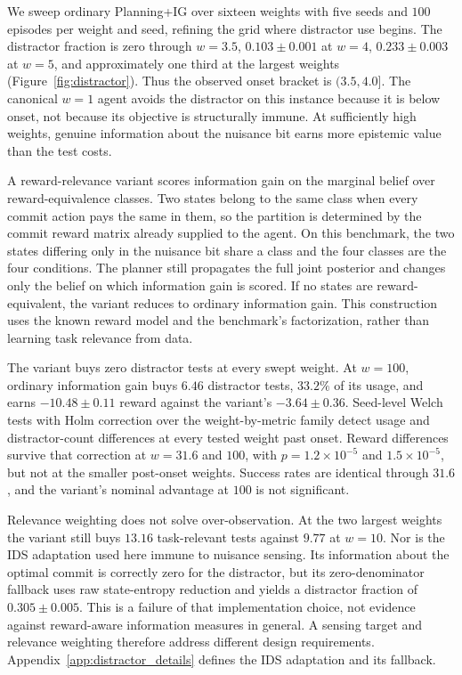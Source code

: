 \documentclass[runningheads]{llncs}
\begin{document}
We sweep ordinary Planning+IG over sixteen weights with five seeds and $100$ episodes per weight and seed, refining the grid where distractor use begins. The distractor fraction is zero through $w{=}3.5$, $0.103\pm0.001$ at $w{=}4$, $0.233\pm0.003$ at $w{=}5$, and approximately one third at the largest weights (Figure~\ref{fig:distractor}). Thus the observed onset bracket is $(3.5,4.0]$. The canonical $w{=}1$ agent avoids the distractor on this instance because it is below onset, not because its objective is structurally immune. At sufficiently high weights, genuine information about the nuisance bit earns more epistemic value than the test costs.

A reward-relevance variant scores information gain on the marginal belief over reward-equivalence classes. Two states belong to the same class when every commit action pays the same in them, so the partition is determined by the commit reward matrix already supplied to the agent. On this benchmark, the two states differing only in the nuisance bit share a class and the four classes are the four conditions. The planner still propagates the full joint posterior and changes only the belief on which information gain is scored. If no states are reward-equivalent, the variant reduces to ordinary information gain. This construction uses the known reward model and the benchmark's factorization, rather than learning task relevance from data.

The variant buys zero distractor tests at every swept weight. At $w{=}100$, ordinary information gain buys $6.46$ distractor tests, $33.2\%$ of its usage, and earns $-10.48\pm0.11$ reward against the variant's $-3.64\pm0.36$. Seed-level Welch tests with Holm correction over the weight-by-metric family detect usage and distractor-count differences at every tested weight past onset. Reward differences survive that correction at $w{=}31.6$ and $100$, with $p=1.2{\times}10^{-5}$ and $1.5{\times}10^{-5}$, but not at the smaller post-onset weights. Success rates are identical through $31.6$, and the variant's nominal advantage at $100$ is not significant.

Relevance weighting does not solve over-observation. At the two largest weights the variant still buys $13.16$ task-relevant tests against $9.77$ at $w{=}10$. Nor is the IDS adaptation used here immune to nuisance sensing. Its information about the optimal commit is correctly zero for the distractor, but its zero-denominator fallback uses raw state-entropy reduction and yields a distractor fraction of $0.305\pm0.005$. This is a failure of that implementation choice, not evidence against reward-aware information measures in general. A sensing target and relevance weighting therefore address different design requirements. Appendix~\ref{app:distractor_details} defines the IDS adaptation and its fallback.
\end{document}
